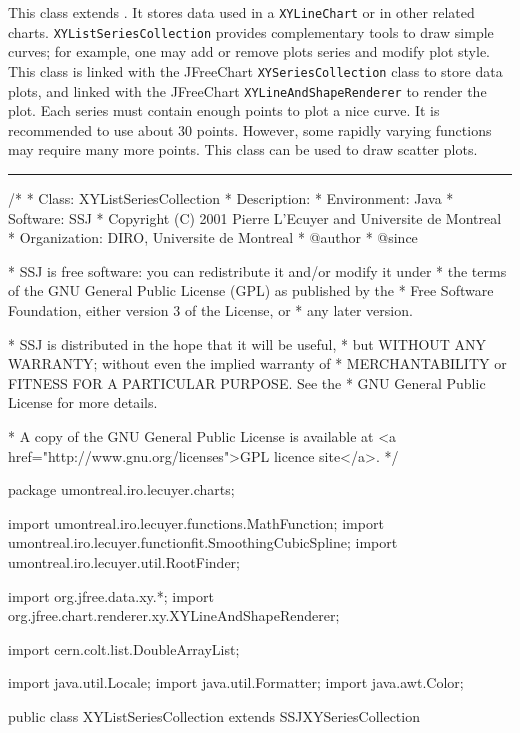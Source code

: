 
This class extends
.
It stores data used in a \texttt{XYLineChart} or in other related charts.
%
\texttt{XYListSeriesCollection} provides complementary tools to draw
 simple curves; for example, one may
add or remove plots series and modify plot style.
This class is linked with the JFreeChart \texttt{XYSeriesCollection} class to
store data plots,
and linked with the JFreeChart \texttt{XYLineAndShapeRenderer} to render the plot.
Each series must contain enough points to plot a nice curve.
It is recommended to use about 30 points. However, some rapidly
varying functions may require many more points. This class can be used to draw scatter plots.

\bigskip\hrule
\begin{code}
\begin{hide}
/*
 * Class:        XYListSeriesCollection
 * Description:  
 * Environment:  Java
 * Software:     SSJ 
 * Copyright (C) 2001  Pierre L'Ecuyer and Universite de Montreal
 * Organization: DIRO, Universite de Montreal
 * @author       
 * @since

 * SSJ is free software: you can redistribute it and/or modify it under
 * the terms of the GNU General Public License (GPL) as published by the
 * Free Software Foundation, either version 3 of the License, or
 * any later version.

 * SSJ is distributed in the hope that it will be useful,
 * but WITHOUT ANY WARRANTY; without even the implied warranty of
 * MERCHANTABILITY or FITNESS FOR A PARTICULAR PURPOSE.  See the
 * GNU General Public License for more details.

 * A copy of the GNU General Public License is available at
   <a href="http://www.gnu.org/licenses">GPL licence site</a>.
 */
\end{hide}
package umontreal.iro.lecuyer.charts;\begin{hide}

import   umontreal.iro.lecuyer.functions.MathFunction;
import   umontreal.iro.lecuyer.functionfit.SmoothingCubicSpline;
import   umontreal.iro.lecuyer.util.RootFinder;

import   org.jfree.data.xy.*;
import   org.jfree.chart.renderer.xy.XYLineAndShapeRenderer;

import   cern.colt.list.DoubleArrayList;

import   java.util.Locale;
import   java.util.Formatter;
import   java.awt.Color;\end{hide}

public class XYListSeriesCollection  extends SSJXYSeriesCollection \begin{hide} {
   protected String[] marksType;   // marks on points (+, x, *...)
   protected String[] dashPattern; // line dashing (solid, dotted, densely dotted, loosely dotted,
                                 //               dashed, densely dashed, loosely dashed, only marks)
   protected String[] plotStyle;   // plot style (lines, curves...)
   private boolean autoCompletion = false;
\end{hide}
\end{code}

